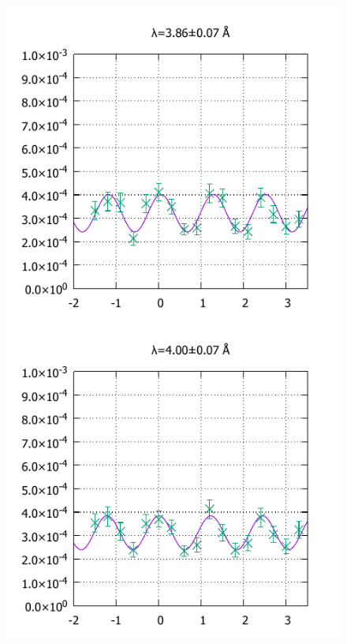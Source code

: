\begin{figure}[H]
\begin{minipage}{0.33\hsize}
\includegraphics[width=\imgwidth]{phase_shifter/wl/wlf7.pdf}
\end{minipage}
\begin{minipage}{0.33\hsize}
\includegraphics[width=\imgwidth]{phase_shifter/wl/wlf9.pdf}
\end{minipage}
\begin{minipage}{0.33\hsize}

\end{minipage}
\end{figure}
